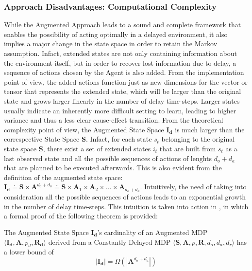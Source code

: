             \subsubsection{Approach Disadvantages: Computational Complexity}
                While the Augmented Approach leads to a sound and complete framework that enables the possibility of acting optimally in a delayed environment, it also implies a major change in the state space in order to retain the Markov assumption. Infact, extended states are not only containing information about the environment itself, but in order to recover lost information due to delay, a sequence of actions chosen by the Agent is also added. \newline
                From the implementation point of view, the added actions function just as new dimensions for the vector or tensor that represents the extended state, which will be larger than the original state and grows larger linearly in the number of delay time-steps. Larger states usually indicate an inherently more difficult setting to learn, leading to higher variance and thus a less clear cause-effect transition. From the theoretical complexity point of view, the Augmented State Space $\mathbf{I_d}$ is much larger than the correspective State Space $\mathbf{S}$. Infact, for each state $s_t$ belonging to the original state space $\mathbf{S}$, there exist a set of extended states $i_t$ that are built from $s_t$ as a last observed state and all the possible sequences of actions of lenghts $d_o+d_a$ that are planned to be executed afterwards. This is also evident from the definition of the augmented state space: $\mathbf{I_d} \doteq \mathbf{S} \times \mathbf{A}^{d_o+d_a} \doteq \mathbf{S} \times \mathbf{A}_{1} \times \mathbf{A}_{2} \times ... \times \mathbf{A}_{d_o+d_a}$. Intuitively, the need of taking into consideration all the possible sequences of actions leads to an exponential growth in the number of delay time-steps. This intuition is taken into action in , in which a formal proof of the following theorem is provided:
                
                \begin{theorem}
                    \label{th:dmdpobscomplexity}
                    The Augmented State Space $\mathbf{I_d}$'s cardinality of an Augmented MDP $\langle \mathbf{I_d}, \mathbf{A}, p_d, \mathbf{R_d} \rangle$ derived from a Constantly Delayed MDP $\langle \mathbf{S}, \mathbf{A}, p, \mathbf{R}, d_o, d_a, d_r \rangle$ has a lower bound of \[ | \mathbf{I_d} | = \Omega \left( | \mathbf{A}^{d_o + d_a} | \right) \]
                \end{theorem}
                
